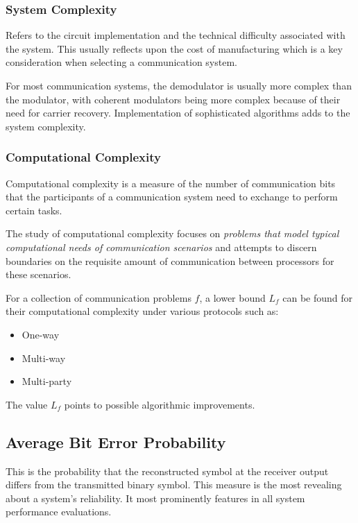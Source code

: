 \subsubsection{System Complexity}
Refers to the circuit implementation and the technical difficulty associated with the system. This usually reflects upon the cost of manufacturing which is a key consideration when selecting a communication system.

For most communication systems, the demodulator is usually more complex than the modulator, with coherent modulators being more complex because of their need for carrier recovery. Implementation of sophisticated algorithms adds to the system complexity.
\subsubsection{Computational Complexity}
Computational complexity is a measure of the number of communication bits that the participants of a communication system need to exchange to perform certain tasks.

The study of computational complexity focuses on \emph{problems that model typical computational needs of communication scenarios} and attempts to discern boundaries on the requisite amount of communication between processors for these scenarios.

For a collection of communication problems \(f\), a lower bound \(L_f\) can be found for their computational complexity under various protocols such as:
\begin{itemize}
	\item One-way
	\item Multi-way
	\item Multi-party
\end{itemize}
The value \(L_f\) points to possible algorithmic improvements.

\subsection{Average Bit Error Probability}
This is the probability that the reconstructed symbol at the receiver output differs from the transmitted binary symbol. This measure is the most revealing about a system's reliability. It most prominently features in all system performance evaluations\cite{hayk}.

